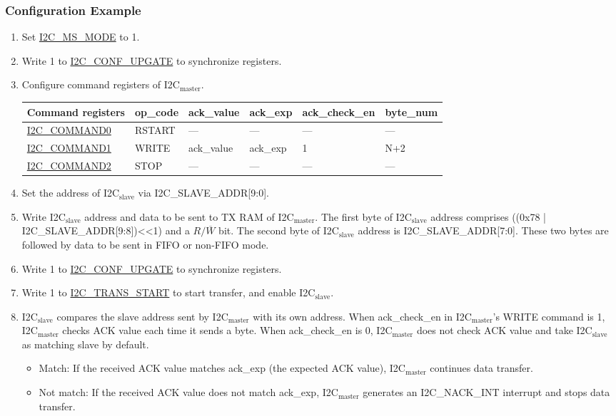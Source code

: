 \documentclass[main\_\_EN.tex]{subfiles}
\begin{document}
\subsubsection{Configuration Example}
\begin{enumerate}
\item Set \hyperref[fielddesc:I2CMSMODE]{I2C\_MS\_MODE} to 1.
\item Write 1 to \hyperref[fielddesc:I2CCONFUPGATE]{I2C\_CONF\_UPGATE} to synchronize registers.
\item Configure command registers of I2C$_\text{master}$.

\begin{longtable}{ | p{4cm} | p{2cm} | p{2cm} | p{2cm} |p{2cm} | p{2cm} |}
\hline\rowcolor{lightgray}
Command registers& op\_code & ack\_value&ack\_exp&ack\_check\_en&byte\_num  \\ \hline
\hyperref[fielddesc:I2CCOMMAND0]{I2C\_COMMAND0} & RSTART& ---&---&---&---  \\ \hline
\hyperref[fielddesc:I2CCOMMAND1]{I2C\_COMMAND1} & WRITE& ack\_value&ack\_exp&1&N+2  \\ \hline
\hyperref[fielddesc:I2CCOMMAND2]{I2C\_COMMAND2} & STOP& ---&---&---&---  \\ \hline
\end{longtable}

\item Set the address of I2C$_\text{slave}$ via I2C\_SLAVE\_ADDR[9:0].
\item Write I2C$_\text{slave}$ address and data to be sent to TX RAM of I2C$_\text{master}$. The first byte of I2C$_\text{slave}$ address comprises ((0x78 | I2C\_SLAVE\_ADDR[9:8])<<1) and a $R/\overline W$ bit. The second byte of I2C$_\text{slave}$ address is I2C\_SLAVE\_ADDR[7:0]. These two bytes are followed by data to be sent in FIFO or non-FIFO mode.
\item Write 1 to \hyperref[fielddesc:I2CCONFUPGATE]{I2C\_CONF\_UPGATE} to synchronize registers.
\item Write 1 to \hyperref[fielddesc:I2CTRANSSTART]{I2C\_TRANS\_START} to start transfer, and enable I2C$_\text{slave}$.
\item I2C$_\text{slave}$ compares the slave address sent by I2C$_\text{master}$ with its own address. When ack\_check\_en in I2C$_\text{master}$'s WRITE command is 1, I2C$_\text{master}$ checks ACK value each time it sends a byte. When ack\_check\_en is 0, I2C$_\text{master}$ does not check ACK value and take I2C$_\text{slave}$ as matching slave by default.
\begin{itemize}
\item Match: If the received ACK value matches ack\_exp (the expected ACK value), I2C$_\text{master}$ continues data transfer.
\item Not match: If the received ACK value does not match ack\_exp, I2C$_\text{master}$ generates an I2C\_NACK\_INT interrupt and stops data transfer.
\end{itemize}


\end{enumerate}
\end{document}
